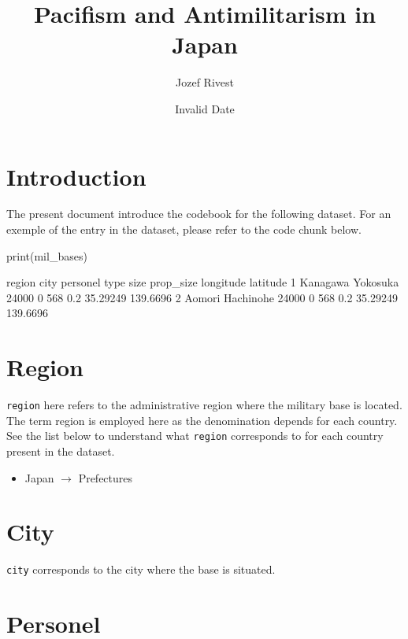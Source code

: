 \documentclass[
]{article}
\title{Pacifism and Antimilitarism in Japan}
\author{Jozef Rivest}
\date{Invalid Date}
\providecommand{\tightlist}{%
  \setlength{\itemsep}{0pt}\setlength{\parskip}{0pt}}\usepackage{longtable,booktabs,array}
\newenvironment{CodeChunk}{\begin{snugshade}}{\end{snugshade}}
\begin{document}
\maketitle


\clearpage
\tableofcontents

\clearpage

\section{Introduction}\label{introduction}

The present document introduce the codebook for the following dataset.
For an exemple of the entry in the dataset, please refer to the code
chunk below.

\begin{CodeChunk}
\begin{Highlighting}{}
print(mil_bases)\end{Highlighting}
    region      city personel type size prop\_size longitude latitude
1 Kanagawa  Yokosuka    24000    0  568       0.2  35.29249 139.6696
2   Aomori Hachinohe    24000    0  568       0.2  35.29249 139.6696
\end{CodeChunk}

\section{Region}\label{region}

\texttt{region} here refers to the administrative region where the
military base is located. The term region is employed here as the
denomination depends for each country. See the list below to understand
what \texttt{region} corresponds to for each country present in the
dataset.

\begin{itemize}
\tightlist
\item
  Japan \(\rightarrow\) Prefectures
\end{itemize}

\section{City}\label{city}

\texttt{city} corresponds to the city where the base is situated.

\section{Personel}\label{personel}
\end{document}
